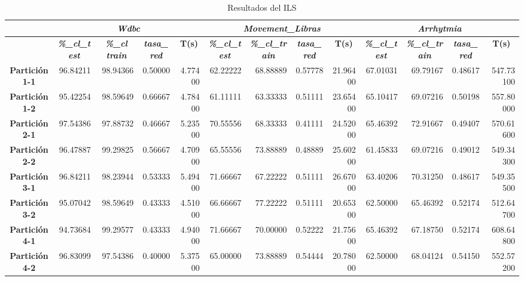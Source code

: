 \documentclass[a4paper,11pt]{article}
\begin{document}
  
  \begin{table}[H]
  \caption{Resultados del ILS}
  \begin{adjustbox}{width=1.1\textwidth}
  \begin{tabular}{|c|r|r|r|r|r|r|r|r|r|r|r|r|}
  \hline
  \multicolumn{1}{|l|}{} & \multicolumn{ 4}{c|}{\textbf{\textit{Wdbc}}} & \multicolumn{ 4}{c|}{\textbf{\textit{Movement\_Libras}}} & \multicolumn{ 4}{c|}{\textbf{\textit{Arrhytmia}}} \\ \hline
  \multicolumn{1}{|l|}{} & \multicolumn{1}{c|}{\textbf{\textit{\%\_cl\_test}}} & \multicolumn{1}{c|}{\textbf{\textit{\%\_cl train}}} & \multicolumn{1}{c|}{\textbf{\textit{tasa\_red}}} & \multicolumn{1}{c|}{\textbf{T(s)}} & \multicolumn{1}{c|}{\textbf{\textit{\%\_cl\_test}}} & \multicolumn{1}{c|}{\textbf{\textit{\%\_cl\_train}}} & \multicolumn{1}{c|}{\textbf{\textit{tasa\_red}}} & \multicolumn{1}{c|}{\textbf{T(s)}} & \multicolumn{1}{c|}{\textbf{\textit{\%\_cl\_test}}} & \multicolumn{1}{c|}{\textbf{\textit{\%\_cl\_train}}} & \multicolumn{1}{c|}{\textbf{\textit{tasa\_red}}} & \multicolumn{1}{c|}{\textbf{T(s)}} \\ \hline
  \textbf{Partición 1-1} & 96.84211 & 98.94366 & 0.50000 & 4.77400 & 62.22222 & 68.88889 & 0.57778 & 21.96400 & 67.01031 & 69.79167 & 0.48617 & 547.73100 \\ \hline
  \textbf{Partición 1-2} & 95.42254 & 98.59649 & 0.66667 & 4.78400 & 61.11111 & 63.33333 & 0.51111 & 23.65400 & 65.10417 & 69.07216 & 0.50198 & 557.80000 \\ \hline
  \textbf{Partición 2-1} & 97.54386 & 97.88732 & 0.46667 & 5.23500 & 70.55556 & 68.33333 & 0.41111 & 24.52000 & 65.46392 & 72.91667 & 0.49407 & 570.61600 \\ \hline
  \textbf{Partición 2-2} & 96.47887 & 99.29825 & 0.56667 & 4.70900 & 65.55556 & 73.88889 & 0.48889 & 25.60200 & 61.45833 & 69.07216 & 0.49012 & 549.34300 \\ \hline
  \textbf{Partición 3-1} & 96.84211 & 98.23944 & 0.53333 & 5.49400 & 71.66667 & 67.22222 & 0.51111 & 26.67000 & 63.40206 & 70.31250 & 0.48617 & 549.35500 \\ \hline
  \textbf{Partición 3-2} & 95.07042 & 98.59649 & 0.43333 & 4.51000 & 66.66667 & 77.22222 & 0.51111 & 20.65300 & 62.50000 & 65.46392 & 0.52174 & 512.64700 \\ \hline
  \textbf{Partición 4-1} & 94.73684 & 99.29577 & 0.43333 & 4.94000 & 71.66667 & 70.00000 & 0.52222 & 21.75600 & 65.46392 & 67.18750 & 0.52174 & 608.64800 \\ \hline
  \textbf{Partición 4-2} & 96.83099 & 97.54386 & 0.40000 & 5.37500 & 65.00000 & 73.88889 & 0.54444 & 20.78000 & 62.50000 & 68.04124 & 0.54150 & 552.57200 \\ \hline

\end{tabular}
\end{adjustbox}
\end{table}
\end{document}
